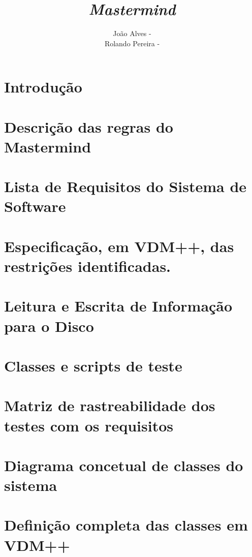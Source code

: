 \documentclass{article}
\title{\emph{Mastermind}}
\author{João Alves - \email{ei08083@fe.up.pt} \\
  Rolando Pereira - \email{ei08150@fe.up.pt}}
\begin{document}




\tableofcontents

\newpage


\section{Introdução}

\section{Descrição das regras do Mastermind}

\section{Lista de Requisitos do Sistema de Software}
\label{sec:lista_requisitos}

\section{Especificação, em VDM++, das restrições identificadas.}


\section{Leitura e Escrita de Informação para o Disco}
\label{sec:leitura_escrita}



\section{Classes e scripts de teste}


\section{Matriz de rastreabilidade dos testes com os requisitos}


\newpage
\section{Diagrama concetual de classes do sistema}


\section{Definição completa das classes em VDM++}
\end{document}
